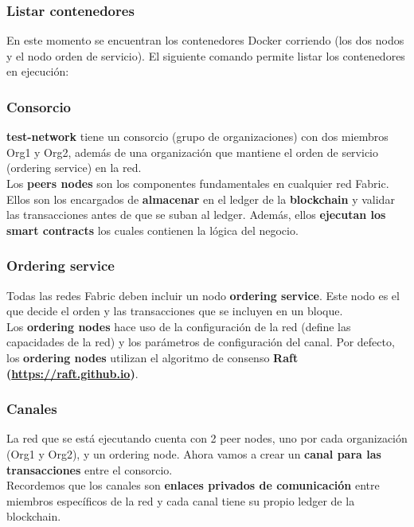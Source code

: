 \documentclass{beamer}
\begin{document}
	\begin{frame}
		\frametitle{Listar contenedores}
		En este momento se encuentran los contenedores Docker corriendo (los dos nodos y el nodo orden de servicio). El siguiente comando permite listar los contenedores en ejecución:
		\begin{center}
			\setlength{\fboxrule}{1mm}
			\setlength{\fboxsep}{3mm}
		\end{center}
	\end{frame}
	
	\begin{frame}
		\frametitle{Consorcio}
		\textbf{test-network} tiene  un consorcio (grupo de organizaciones)  con dos miembros Org1 y Org2, además de una organización que mantiene el orden de servicio (ordering service) en la red.\\
		\vspace{4mm}
		Los \textbf{peers nodes} son los componentes fundamentales en cualquier red Fabric. Ellos son los encargados de \textbf{almacenar} en el ledger de la \textbf{blockchain} y validar las transacciones antes de que se suban al ledger. Además, ellos \textbf{ejecutan los smart contracts} los cuales contienen la lógica del negocio.
	\end{frame}
	
	\begin{frame}
		\frametitle{Ordering service}
		Todas las redes Fabric deben incluir un nodo \textbf{ordering service}. Este nodo es el que decide el orden y las transacciones que se incluyen en un bloque.\\
		\vspace{4mm}
		Los \textbf{ordering nodes} hace uso de la configuración de la red (define las capacidades de la red) y los parámetros de configuración del canal. Por defecto, los \textbf{ordering nodes} utilizan el algoritmo de consenso \textbf{Raft (\url{https://raft.github.io})}.
	\end{frame}
	
	\begin{frame}
		\frametitle{Canales}
		La red que se está ejecutando cuenta con 2 peer nodes, uno por cada organización (Org1 y Org2), y un ordering node. Ahora vamos a crear un \textbf{canal para las transacciones} entre el consorcio.\\
		\vspace{4mm}
		Recordemos que los canales son \textbf{enlaces privados de comunicación} entre miembros específicos de la red y cada canal tiene su propio ledger de la blockchain.
	\end{frame}
	
\end{document}
